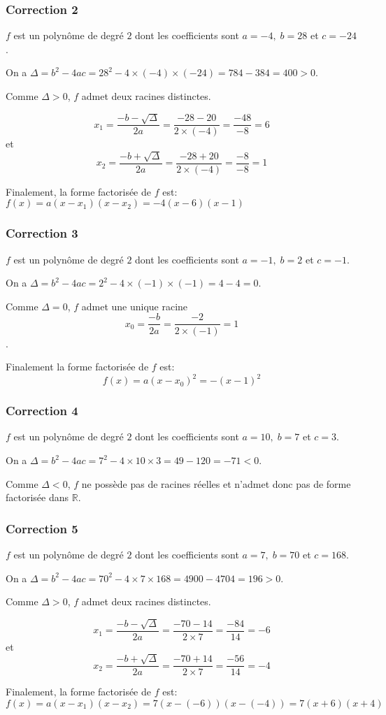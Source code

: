 \documentclass[15pt, mathserif]{beamer}
\begin{document}
\begin{frame}
\vspace{-10mm}
	\frametitle{Correction 2}
$f$ est un polynôme de degré $2$ dont les coefficients sont $a =-4, \; b =28$ et $c =-24$.
 
 On a $\Delta = b^2-4ac =28^2-4 \times\left(-4\right)\times\left(-24\right)=784-384 = 400>0$.


 
 Comme $\Delta>0$, $f$ admet deux racines distinctes. 

\[ x_1 = \dfrac{-b-\sqrt{\Delta}}{2a} = \dfrac{-28-20}{2 \times \left(-4\right)} = \dfrac{-48}{-8} = 6 \] et \[ x_2 = \dfrac{-b+\sqrt{\Delta}}{2a} = \dfrac{-28+20}{2 \times \left(-4\right)} = \dfrac{-8}{-8}=1\] 

Finalement, la forme factorisée de $f$ est: $f(x) = a(x-x_1)(x-x_2) = -4(x-6)(x-1)$\end{frame}


\begin{frame}
\vspace{-10mm}
	\frametitle{Correction 3}
$f$ est un polynôme de degré $2$ dont les coefficients sont $a =-1, \; b =2$ et $c =-1$.
 
 On a $\Delta = b^2-4ac =2^2-4 \times\left(-1\right)\times\left(-1\right)=4-4 = 0$.


 
 Comme $\Delta =0$,  $f$ admet une unique racine $$x_0 = \dfrac{-b}{2a} = \dfrac{-2}{2 \times \left(-1\right)} = 1$$. 

 Finalement la forme factorisée de $f$ est: \[f(x) = a(x-x_0)^2 = -\left(x-1\right)^2\] 

 \bigskip\end{frame}


\begin{frame}
\vspace{-10mm}
	\frametitle{Correction 4}
$f$ est un polynôme de degré $2$ dont les coefficients sont $a =10, \; b =7$ et $c =3$.
 
 On a $\Delta = b^2-4ac =7^2-4 \times10\times3=49-120 = -71<0$.


 
 Comme $\Delta <0$, $f$ ne possède pas de racines réelles et n'admet donc pas de forme factorisée dans $\mathbb{R}$.\end{frame}


\begin{frame}
\vspace{-10mm}
	\frametitle{Correction 5}
$f$ est un polynôme de degré $2$ dont les coefficients sont $a =7, \; b =70$ et $c =168$.
 
 On a $\Delta = b^2-4ac =70^2-4 \times7\times168=4900-4704 = 196>0$.


 
 Comme $\Delta>0$, $f$ admet deux racines distinctes. 

\[ x_1 = \dfrac{-b-\sqrt{\Delta}}{2a} = \dfrac{-70-14}{2 \times 7} = \dfrac{-84}{14} = -6 \] et \[ x_2 = \dfrac{-b+\sqrt{\Delta}}{2a} = \dfrac{-70+14}{2 \times 7} = \dfrac{-56}{14}=-4\] 

Finalement, la forme factorisée de $f$ est: $f(x) = a(x-x_1)(x-x_2) = 7(x-\left(-6\right))(x-\left(-4\right))=7(x+6)(x+4)$\end{frame}
\end{document}

